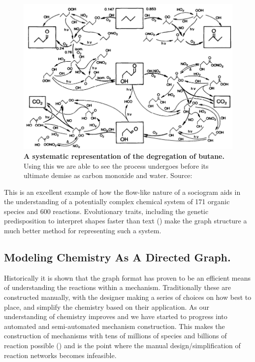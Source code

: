 \begin{figure}[h]
    \centering
        \includegraphics[width=\textwidth]{figures_c1/butane.png}

       \caption{\textbf{A systematic representation of the degregation of butane.} Using this we are able to see the process  undergoes before its ultimate demise as carbon monoxide and water. Source: \citep{butane} }
       \label{fig:butane}
\end{figure}


This is an excellent example of how the flow-like nature of a sociogram aids in the understanding of a potentially complex chemical system of 171 organic species and 600 reactions. Evolutionary traits, including the genetic predisposition to interpret shapes faster than text (\citep{sapiens}) make the graph structure a much better method for representing such a system.





\subsection{Modeling Chemistry As A Directed Graph.}

Historically it is shown that the graph format has proven to be an efficient means of understanding the reactions within a mechanism. Traditionally these are constructed manually, with the designer making a series of choices on how best to place, and simplify the chemistry based on their application. As our understanding of chemistry improves and we have started to progress into automated and semi-automated mechanism construction. This makes the construction of mechanisms with tens of millions of species and billions of reaction possible (\citep{protocol}) and is the point where the manual design/simplification of reaction networks becomes infeasible. 

